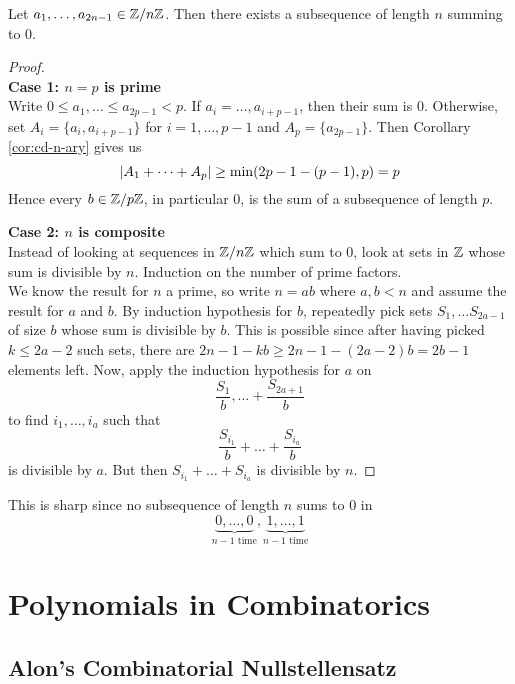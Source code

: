 \documentclass{article}
\begin{document}
\newlec

\begin{nthm}
  Let $a_1, \dots, a_{2n - 1} \in \mathbb Z/n\mathbb Z$. Then there exists a subsequence of length $n$ summing to $0$.
\end{nthm}
\begin{proof}~\\
  {\bf Case 1: $n = p$ is prime} \\
  Write $0 \le a_1, \dots \le a_{2p - 1} < p$. If $a_i = \dots, a_{i + p - 1}$, then their sum is $0$. Otherwise, set $A_i = \{a_i, a_{i + p - 1}\}$ for $i = 1, \dots, p - 1$ and $A_p = \{a_{2p - 1}\}$. Then Corollary \ref{cor:cd-n-ary} gives us
  $$\left\lvert A_1 + \dots + A_p\right\rvert \ge \min(2p - 1 - (p - 1), p) = p$$
  Hence every $b \in \mathbb Z/p\mathbb Z$, in particular $0$, is the sum of a subsequence of length $p$.

  {\bf Case 2: $n$ is composite} \\
  Instead of looking at sequences in $\mathbb Z/n\mathbb Z$ which sum to $0$, look at sets in $\mathbb Z$ whose sum is divisible by $n$. Induction on the number of prime factors. \\
  We know the result for $n$ a prime, so write $n = ab$ where $a, b < n$ and assume the result for $a$ and $b$. By induction hypothesis for $b$, repeatedly pick sets $S_1, \dots S_{2a - 1}$ of size $b$ whose sum is divisible by $b$. This is possible since after having picked $k \le 2a - 2$ such sets, there are $2n - 1 - kb \ge 2n - 1 - (2a - 2)b = 2b - 1$ elements left. Now, apply the induction hypothesis for $a$ on
  $$\frac{S_1}b, \dots + \frac{S_{2a + 1}}b$$
  to find $i_1, \dots, i_a$ such that
  $$\frac{S_{i_1}}b + \dots + \frac{S_{i_a}}b$$
  is divisible by $a$. But then $S_{i_1} + \dots + S_{i_a}$ is divisible by $n$.
\end{proof}
\begin{rmk}
  This is sharp since no subsequence of length $n$ sums to $0$ in
  $$\underbrace{0, \dots, 0}_{n - 1\text{ time}}, \underbrace{1, \dots, 1}_{n - 1\text{ time}}$$
\end{rmk}

\clearpage

\section{Polynomials in Combinatorics}

\subsection{Alon's Combinatorial Nullstellensatz}
\end{document}
